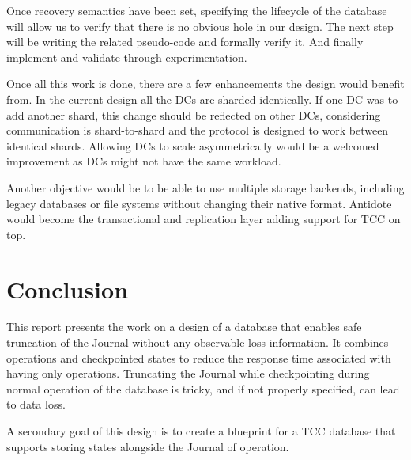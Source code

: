 \documentclass[twoside]{article}
\begin{document}
Once recovery semantics have been set, specifying the lifecycle of the
database will allow us to verify that there is no obvious hole in our design.
The next step will be writing the related pseudo-code and formally verify
it. 
And finally implement and validate through experimentation.

Once all this work is done, there are a few enhancements the design would benefit
from.
In the current design all the DCs are sharded identically. 
If one DC was to add another shard, this change should be reflected on other DCs,
considering communication is shard-to-shard and the protocol is designed to
work between identical shards.
Allowing DCs to scale asymmetrically would be a welcomed improvement as DCs
might not have the same workload.

Another objective would be to be able to use multiple storage backends,
including legacy databases or file systems without changing their
native format. 
Antidote would become the transactional and replication layer adding support
for TCC on top.




\section{Conclusion}
\label{sec:conclusion}

This report presents the work on a design of a database that enables safe 
truncation of the Journal without any observable loss information. 
It combines operations and checkpointed states to reduce the response time
associated with having only operations.
Truncating the Journal while checkpointing during normal operation of the
database is tricky, and if not properly specified, can lead to data loss.

A secondary goal of this design is to create a blueprint for a TCC database that
supports storing states alongside the Journal of operation.




\end{document}
